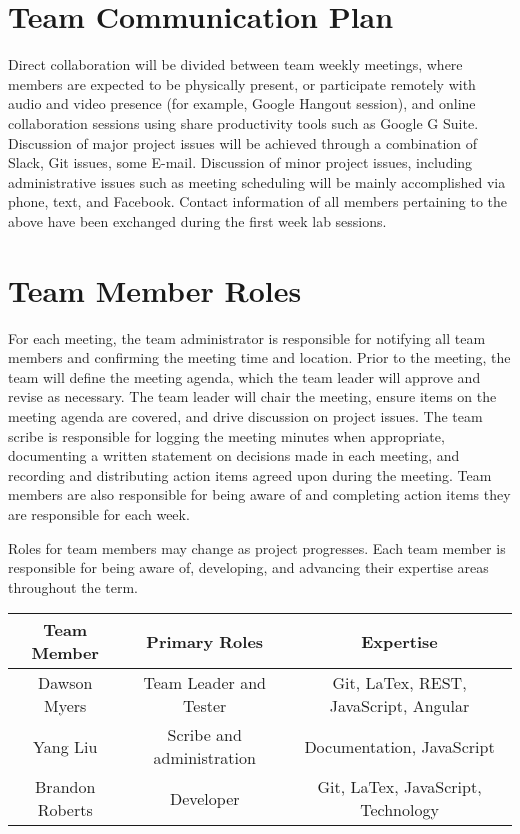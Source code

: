 \documentclass{article}
\begin{document}
\section{Team Communication Plan}
Direct collaboration will be divided between team weekly meetings, where members are expected to be physically present, or participate remotely with audio and video presence (for example, Google Hangout session), and online collaboration sessions using share productivity tools such as Google G Suite. Discussion of major project issues will be achieved through a combination of Slack, Git issues, some E-mail. Discussion of minor project issues, including administrative issues such as meeting scheduling will be mainly accomplished via phone, text, and Facebook. Contact information of all members pertaining to the above have been exchanged during the first week lab sessions. 


\section{Team Member Roles}
For each meeting, the team administrator is responsible for notifying all team members and confirming the meeting time and location. Prior to the meeting, the team will define the meeting agenda, which the team leader will approve and revise as necessary. The team leader will chair the meeting, ensure items on the meeting agenda are covered, and drive discussion on project issues. The team scribe is responsible for logging the meeting minutes when appropriate, documenting a written statement on decisions made in each meeting, and recording and distributing action items agreed upon during the meeting. Team members are also responsible for being aware of and completing action items they are responsible for each week.

Roles for team members may change as project progresses. Each team member is responsible for being aware of, developing, and advancing their expertise areas throughout the term.

\begin{center}
    \begin{tabular}{c | c | c}
         Team Member & Primary Roles & Expertise \\ 
         \hline
         Dawson Myers & Team Leader and Tester & Git, LaTex, REST, JavaScript, Angular \\  
         Yang Liu & Scribe and administration & Documentation, JavaScript \\
         Brandon Roberts & Developer & Git, LaTex, JavaScript, Technology \\
    \end{tabular}
\end{center}
\end{document}

